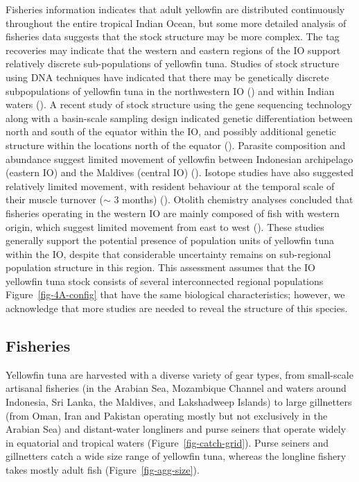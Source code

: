 \documentclass[
]{scrartcl}
\begin{document}
Fisheries information indicates that adult yellowfin are distributed
continuously throughout the entire tropical Indian Ocean, but some more
detailed analysis of fisheries data suggests that the stock structure
may be more complex. The tag recoveries may indicate that the western
and eastern regions of the IO support relatively discrete
sub-populations of yellowfin tuna. Studies of stock structure using DNA
techniques have indicated that there may be genetically discrete
subpopulations of yellowfin tuna in the northwestern IO
() and within Indian waters
(). A
recent study of stock structure using the gene sequencing technology
along with a basin-scale sampling design indicated genetic
differentiation between north and south of the equator within the IO,
and possibly additional genetic structure within the locations north of
the equator (). Parasite composition and abundance suggest limited
movement of yellowfin between Indonesian archipelago (eastern IO) and
the Maldives (central IO)
().
Isotope studies have also suggested relatively limited movement, with
resident behaviour at the temporal scale of their muscle turnover
(\(\sim\) 3 months)
().
Otolith chemistry analyses concluded that fisheries operating in the
western IO are mainly composed of fish with western origin, which
suggest limited movement from east to west
(). These studies generally support the potential
presence of population units of yellowfin tuna within the IO, despite
that considerable uncertainty remains on sub-regional population
structure in this region. This assessment assumes that the IO yellowfin
tuna stock consists of several interconnected regional populations
Figure~\ref{fig-4A-config} that have the same biological
characteristics; however, we acknowledge that more studies are needed to
reveal the structure of this species.

\subsection{Fisheries}\label{fisheries}

Yellowfin tuna are harvested with a diverse variety of gear types, from
small-scale artisanal fisheries (in the Arabian Sea, Mozambique Channel
and waters around Indonesia, Sri Lanka, the Maldives, and Lakshadweep
Islands) to large gillnetters (from Oman, Iran and Pakistan operating
mostly but not exclusively in the Arabian Sea) and distant-water
longliners and purse seiners that operate widely in equatorial and
tropical waters (Figure~\ref{fig-catch-grid}). Purse seiners and
gillnetters catch a wide size range of yellowfin tuna, whereas the
longline fishery takes mostly adult fish (Figure~\ref{fig-agg-size}).
\end{document}
